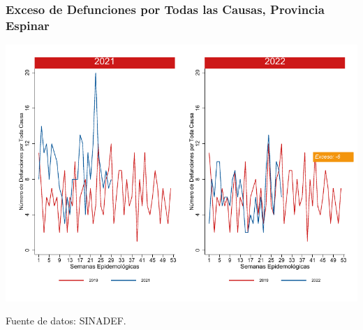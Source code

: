 \documentclass[xcolor=table]{beamer}
\begin{document}
\begin{frame}
	\frametitle{Exceso de Defunciones por Todas las Causas, Provincia Espinar}
	\vspace{-.5cm}
	\begin{center}
		\includegraphics[width=0.8\linewidth, trim={0cm .5cm 0cm 0.2cm},clip]{../figuras/exceso_8.pdf}
	\end{center}
	{\tiny Fuente de datos: SINADEF.}
	
	\hyperlink{indicadores_provinciales}{}
\end{frame}
\end{document}
